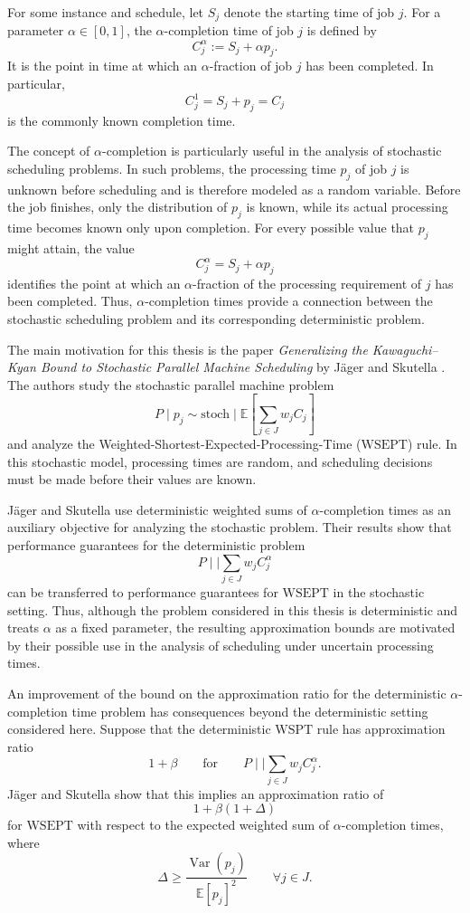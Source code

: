 \documentclass[%
english, titlepage=false %
]{./tum-templates/book/tumbook}
\begin{document}
For some instance and schedule, let \(S_j\) denote the starting time of job \(j\). For a parameter
\(\alpha\in [0,1]\), the \(\alpha\)-completion time of job \(j\) is defined by
\[
    C_j^\alpha:=S_j+\alpha p_j.
\]
It is the point in time at which an \(\alpha\)-fraction of job \(j\) has been completed. 
In particular,
\[
    C_j^1=S_j+p_j=C_j
\]
is the commonly known completion time.

The concept of \(\alpha\)-completion is particularly useful in the analysis
of stochastic scheduling problems. In such problems, the processing
time \(p_j\) of job \(j\) is unknown before scheduling and is therefore modeled as a random variable. 
Before the job finishes, only the distribution of \(p_j\) is known, while its actual
processing time becomes known only upon completion. For every possible value that $p_j$ might attain, the value
\[
    C_j^\alpha=S_j+\alpha p_j
\]
identifies the point at which an \(\alpha\)-fraction of the 
processing requirement of $j$ has been completed. Thus,
\(\alpha\)-completion times provide a connection between the stochastic
scheduling problem and its corresponding deterministic problem.
 
The main motivation for this thesis is the paper
\emph{Generalizing the Kawaguchi--Kyan Bound to Stochastic Parallel
Machine Scheduling} by Jäger and Skutella
\cite{JaegerSkutella2018}. The authors study the stochastic parallel
machine problem
\[
    P\mid p_j\sim\mathrm{stoch}\mid
    \mathbb{E}\!\left[\sum_{j\in J}w_jC_j\right]
\]
and analyze the Weighted-Shortest-Expected-Processing-Time ($\mathrm{WSEPT}$) rule.
In this stochastic model, processing times are random, and scheduling decisions must be made before their values are known.

Jäger and Skutella use deterministic weighted sums of
\(\alpha\)-completion times as an auxiliary objective for analyzing the stochastic
problem. Their results show that performance guarantees for the
deterministic problem
\[
    P\mid\mid\sum_{j\in J}w_jC_j^\alpha
\]
can be transferred to performance guarantees for $\mathrm{WSEPT}$ in the
stochastic setting. Thus, although the problem considered in this
thesis is deterministic and treats \(\alpha\) as a fixed parameter,
the resulting approximation bounds are motivated by their possible use
in the analysis of scheduling under uncertain processing times.


An improvement of the bound on the approximation ratio for the deterministic
\(\alpha\)-completion time problem has consequences beyond the deterministic
setting considered here. Suppose that the deterministic $\mathrm{WSPT}$ rule has
approximation ratio
\[
   1+\beta \qquad \text{for} \qquad P\mid\mid\sum_{j\in J}w_jC_j^\alpha.
\]
Jäger and Skutella show that this implies an approximation ratio of
\[
    1+\beta(1+\Delta)
\]
for $\mathrm{WSEPT}$ with respect to the expected weighted sum of
\(\alpha\)-completion times, where
\[
    \Delta
    \ge
    \frac{\operatorname{Var}(p_j)}
         {\mathbb{E}[p_j]^2} \qquad \forall j\in J.
\]
\end{document}
